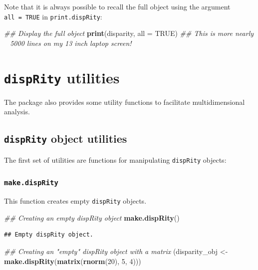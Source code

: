 \documentclass[]{book}
\newenvironment{Shaded}{\begin{snugshade}}{\end{snugshade}}
\newcommand{\CommentTok}[1]{\textcolor[rgb]{0.56,0.35,0.01}{\textit{#1}}}
\newcommand{\DataTypeTok}[1]{\textcolor[rgb]{0.13,0.29,0.53}{#1}}
\newcommand{\DecValTok}[1]{\textcolor[rgb]{0.00,0.00,0.81}{#1}}
\newcommand{\KeywordTok}[1]{\textcolor[rgb]{0.13,0.29,0.53}{\textbf{#1}}}
\newcommand{\NormalTok}[1]{#1}
\newcommand{\OtherTok}[1]{\textcolor[rgb]{0.56,0.35,0.01}{#1}}
\newcommand{\StringTok}[1]{\textcolor[rgb]{0.31,0.60,0.02}{#1}}
\begin{document}
Note that it is always possible to recall the full object using the argument \texttt{all\ =\ TRUE} in \texttt{print.dispRity}:

\begin{Shaded}
\begin{Highlighting}[]
\CommentTok{## Display the full object}
\KeywordTok{print}\NormalTok{(disparity, }\DataTypeTok{all =} \OtherTok{TRUE}\NormalTok{)}
\CommentTok{## This is more nearly ~ 5000 lines on my 13 inch laptop screen!}
\end{Highlighting}
\end{Shaded}

\hypertarget{utilities}{%
\section{\texorpdfstring{\texttt{dispRity} utilities}{dispRity utilities}}\label{utilities}}

The package also provides some utility functions to facilitate multidimensional analysis.

\hypertarget{disprity-object-utilities}{%
\subsection{\texorpdfstring{\texttt{dispRity} object utilities }{dispRity object utilities }}\label{disprity-object-utilities}}

The first set of utilities are functions for manipulating \texttt{dispRity} objects:

\hypertarget{make.disprity}{%
\subsubsection{\texorpdfstring{\texttt{make.dispRity}}{make.dispRity}}\label{make.disprity}}

This function creates empty \texttt{dispRity} objects.

\begin{Shaded}
\begin{Highlighting}[]
\CommentTok{## Creating an empty dispRity object}
\KeywordTok{make.dispRity}\NormalTok{()}
\end{Highlighting}
\end{Shaded}

\begin{verbatim}
## Empty dispRity object.
\end{verbatim}

\begin{Shaded}
\begin{Highlighting}[]
\CommentTok{## Creating an "empty" dispRity object with a matrix}
\NormalTok{(disparity_obj <-}\StringTok{ }\KeywordTok{make.dispRity}\NormalTok{(}\KeywordTok{matrix}\NormalTok{(}\KeywordTok{rnorm}\NormalTok{(}\DecValTok{20}\NormalTok{), }\DecValTok{5}\NormalTok{, }\DecValTok{4}\NormalTok{)))}
\end{Highlighting}
\end{Shaded}
\end{document}
